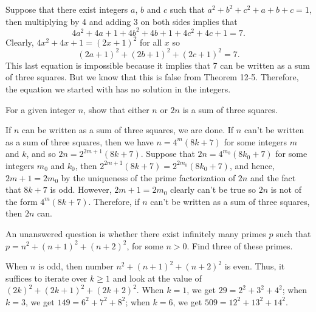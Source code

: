 \begin{solution}
    Suppose that there exist integers $a$, $b$ and $c$ such that $a^2 + b^2 + c^2 + a + b + c = 1$, then multiplying by 4 and adding 3 on both sides implies that
    $$4a^2 + 4a + 1 + 4b^2 + 4b + 1 + 4c^2 + 4c + 1 = 7.$$
    Clearly, $4x^2 + 4x + 1 = (2x + 1)^2$ for all $x$ so
    $$(2a + 1)^2 + (2b + 1)^2 + (2c + 1)^2 = 7.$$
    This last equation is impossible because it implies that 7 can be written as a sum of three squares. But we know that this is false from Theorem 12-5. Therefore, the equation we started with has no solution in the integers. \\
\end{solution}

\begin{exercise}
    For a given integer $n$, show that either $n$ or $2n$ is a sum of three squares. \\
\end{exercise}

\begin{solution}
    If $n$ can be written as a sum of three squares, we are done. If $n$ can't be written as a sum of three squares, then we have $n = 4^m(8k + 7)$ for some integers $m$ and $k$, and so $2n = 2^{2m + 1}(8k + 7)$. Suppose that $2n = 4^{m_0}(8k_0 + 7)$ for some integers $m_0$ and $k_0$, then $2^{2m + 1}(8k + 7) = 2^{2m_0}(8k_0 + 7)$, and hence, $2m + 1 = 2m_0$ by the uniqueness of the prime factorization of $2n$ and the fact that $8k + 7$ is odd. However, $2m + 1 = 2m_0$ clearly can't be true so $2n$ is not of the form $4^m(8k+ 7)$. Therefore, if $n$ can't be written as a sum of three squares, then $2n$ can. \\
\end{solution}

\begin{exercise}
    An unanswered question is whether there exist infinitely many primes $p$ such that $p = n^2 + (n+1)^2 + (n+2)^2$, for some $n > 0$. Find three of these primes. \\
\end{exercise}

\begin{solution}
    When $n$ is odd, then number $n^2 + (n+1)^2 + (n+2)^2$ is even. Thus, it suffices to iterate over $k \geq 1$ and look at the value of $(2k)^2 + (2k+1)^2 + (2k+2)^2$. When $k = 1$, we get $29 = 2^2 + 3^2 + 4^2$; when $k = 3$, we get $149 = 6^2 + 7^2 + 8^2$; when $k = 6$, we get $509 = 12^2 + 13^2 + 14^2$. \\
\end{solution}

